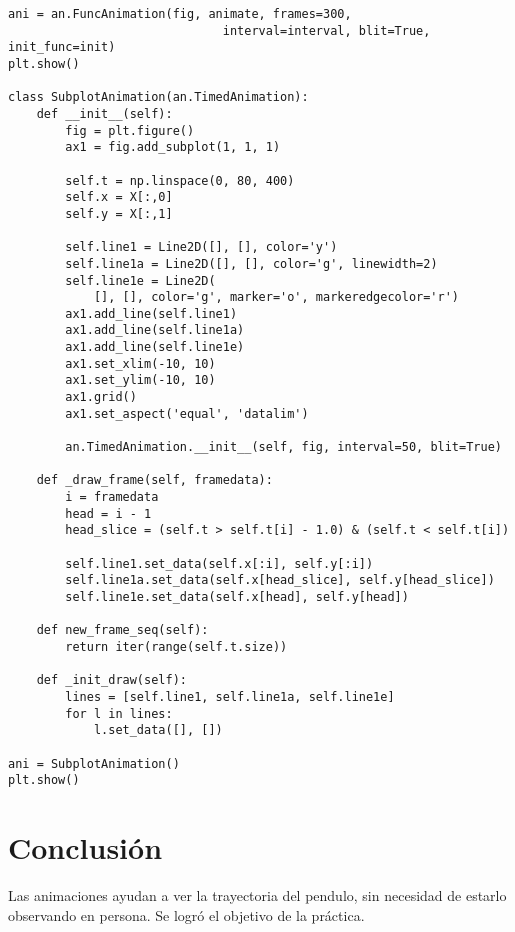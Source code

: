 \documentclass[a4paper]{article}
\begin{document}
\begin{verbatim}
ani = an.FuncAnimation(fig, animate, frames=300,
                              interval=interval, blit=True, init_func=init)
plt.show()

class SubplotAnimation(an.TimedAnimation):
    def __init__(self):
        fig = plt.figure()
        ax1 = fig.add_subplot(1, 1, 1)
       
        self.t = np.linspace(0, 80, 400)
        self.x = X[:,0]
        self.y = X[:,1]

        self.line1 = Line2D([], [], color='y')
        self.line1a = Line2D([], [], color='g', linewidth=2)
        self.line1e = Line2D(
            [], [], color='g', marker='o', markeredgecolor='r')
        ax1.add_line(self.line1)
        ax1.add_line(self.line1a)
        ax1.add_line(self.line1e)
        ax1.set_xlim(-10, 10)
        ax1.set_ylim(-10, 10)
        ax1.grid()
        ax1.set_aspect('equal', 'datalim')

        an.TimedAnimation.__init__(self, fig, interval=50, blit=True)

    def _draw_frame(self, framedata):
        i = framedata
        head = i - 1
        head_slice = (self.t > self.t[i] - 1.0) & (self.t < self.t[i])

        self.line1.set_data(self.x[:i], self.y[:i])
        self.line1a.set_data(self.x[head_slice], self.y[head_slice])
        self.line1e.set_data(self.x[head], self.y[head])

    def new_frame_seq(self):
        return iter(range(self.t.size))

    def _init_draw(self):
        lines = [self.line1, self.line1a, self.line1e]
        for l in lines:
            l.set_data([], [])

ani = SubplotAnimation()
plt.show()
\end{verbatim}
\section{Conclusión}
Las animaciones ayudan a ver la trayectoria del pendulo, sin necesidad de estarlo observando en persona.
Se logró el objetivo de la práctica. 
\end{document}
